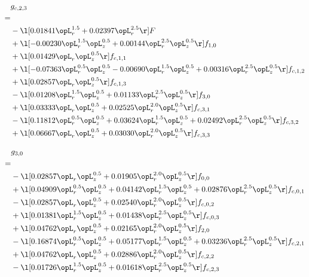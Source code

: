 \begin{alignat}{2} 
\label{eq:g_23_0} 
& g_{c,2,3} \nonumber \\ 
 = \\ 
& - \l[  0.01841 \opL_r^{1.5} +  0.02397 \opL_r^{2.5}  \r] F \nonumber \\ 
& + \l[  -0.00230 \opL_r^{1.5} \opL_z^{0.5} +  0.00144 \opL_r^{2.5} \opL_z^{0.5}  \r] f_{1,0} \nonumber \\ 
& + \l[  0.01429 \opL_r \opL_z^{0.5}  \r] f_{c,1,1} \nonumber \\ 
& + \l[  -0.07363 \opL_r^{0.5} \opL_z^{0.5}   -0.00690 \opL_r^{1.5} \opL_z^{0.5} +  0.00316 \opL_r^{2.5} \opL_z^{0.5}  \r] f_{c,1,2} \nonumber \\ 
& + \l[  0.02857 \opL_r \opL_z^{0.5}  \r] f_{c,1,3} \nonumber \\ 
& - \l[  0.01208 \opL_r^{1.5} \opL_z^{0.5} +  0.01133 \opL_r^{2.5} \opL_z^{0.5}  \r] f_{3,0} \nonumber \\ 
& + \l[  0.03333 \opL_r \opL_z^{0.5} +  0.02525 \opL_r^{2.0} \opL_z^{0.5}  \r] f_{c,3,1} \nonumber \\ 
& - \l[  0.11812 \opL_r^{0.5} \opL_z^{0.5} +  0.03624 \opL_r^{1.5} \opL_z^{0.5} +  0.02492 \opL_r^{2.5} \opL_z^{0.5}  \r] f_{c,3,2} \nonumber \\ 
& + \l[  0.06667 \opL_r \opL_z^{0.5} +  0.03030 \opL_r^{2.0} \opL_z^{0.5}  \r] f_{c,3,3} \nonumber \\ 
\end{alignat} 


\begin{alignat}{2} 
\label{eq:g_30_0} 
& g_{3,0} \nonumber \\ 
 = \\ 
& - \l[  0.02857 \opL_r \opL_z^{0.5} +  0.01905 \opL_r^{2.0} \opL_z^{0.5}  \r] f_{0,0} \nonumber \\ 
& + \l[  0.04909 \opL_r^{0.5} \opL_z^{0.5} +  0.04142 \opL_r^{1.5} \opL_z^{0.5} +  0.02876 \opL_r^{2.5} \opL_z^{0.5}  \r] f_{c,0,1} \nonumber \\ 
& - \l[  0.02857 \opL_r \opL_z^{0.5} +  0.02540 \opL_r^{2.0} \opL_z^{0.5}  \r] f_{c,0,2} \nonumber \\ 
& + \l[  0.01381 \opL_r^{1.5} \opL_z^{0.5} +  0.01438 \opL_r^{2.5} \opL_z^{0.5}  \r] f_{c,0,3} \nonumber \\ 
& + \l[  0.04762 \opL_r \opL_z^{0.5} +  0.02165 \opL_r^{2.0} \opL_z^{0.5}  \r] f_{2,0} \nonumber \\ 
& - \l[  0.16874 \opL_r^{0.5} \opL_z^{0.5} +  0.05177 \opL_r^{1.5} \opL_z^{0.5} +  0.03236 \opL_r^{2.5} \opL_z^{0.5}  \r] f_{c,2,1} \nonumber \\ 
& + \l[  0.04762 \opL_r \opL_z^{0.5} +  0.02886 \opL_r^{2.0} \opL_z^{0.5}  \r] f_{c,2,2} \nonumber \\ 
& - \l[  0.01726 \opL_r^{1.5} \opL_z^{0.5} +  0.01618 \opL_r^{2.5} \opL_z^{0.5}  \r] f_{c,2,3} \nonumber \\ 
\end{alignat} 


